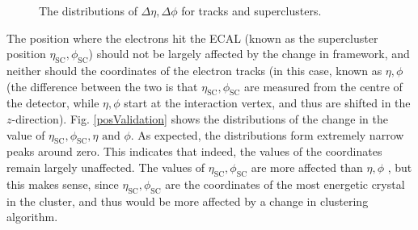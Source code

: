 \documentclass[10pt]{article}
\begin{document}
\begin{figure}[h!]
\begin{subfigure}[b]{0.22\textwidth}
        \end{subfigure}
        \caption{The distributions of $\Delta\eta,\Delta\phi$ for tracks and superclusters.}\label{fig:posValidation}
\end{figure}

The position where the electrons hit the ECAL (known as the supercluster position $\eta_{\text{SC}},\phi_{\text{SC}}$) should not be largely affected by the change in framework, and neither should the coordinates of the electron tracks (in this case, known as $\eta,\phi$  (the difference between the two is that $\eta_{\text{SC}},\phi_{\text{SC}}$ are measured from the centre of the detector, while $\eta,\phi$ start at the interaction vertex, and thus are shifted in the $z$-direction). Fig. \ref{posValidation} shows the distributions of the change in the value of $\eta_{\text{SC}},\phi_{\text{SC}},\eta \text{ and } \phi$. As expected, the distributions form extremely narrow peaks around zero. This indicates that indeed, the values of the coordinates remain largely unaffected. The values of $\eta_{\text{SC}},\phi_{\text{SC}}$ are more affected than $\eta,\phi$ , but this makes sense, since $\eta_{\text{SC}},\phi_{\text{SC}}$ are the coordinates of the most energetic crystal in the cluster, and thus would be more affected by a change in clustering algorithm.
\end{document}
